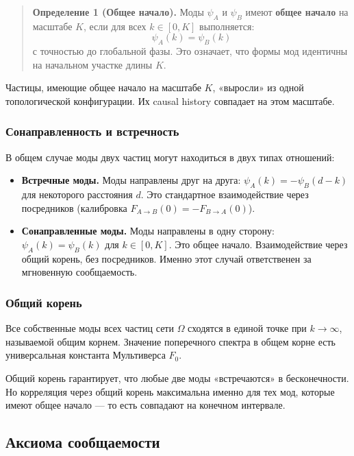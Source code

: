 \documentclass[12pt,a4paper]{article}
\begin{document}
\begin{quote}
\textbf{Определение 1 (Общее начало).} Моды $\psi_A$ и $\psi_B$ имеют \textbf{общее начало} на масштабе $K$, если для всех $k \in [0, K]$ выполняется:
\begin{equation}
    \psi_A(k) = \psi_B(k)
\end{equation}
с точностью до глобальной фазы. Это означает, что формы мод идентичны на начальном участке длины $K$.
\end{quote}

Частицы, имеющие общее начало на масштабе $K$, «выросли» из одной топологической конфигурации. Их causal history совпадает на этом масштабе.

\subsubsection{Сонаправленность и встречность}
В общем случае моды двух частиц могут находиться в двух типах отношений:
\begin{itemize}
    \item \textbf{Встречные моды.} Моды направлены друг на друга: $\psi_A(k) = -\psi_B(d - k)$ для некоторого расстояния $d$. Это стандартное взаимодействие через посредников (калибровка $F_{A \to B}(0) = -F_{B \to A}(0)$).
    \item \textbf{Сонаправленные моды.} Моды направлены в одну сторону: $\psi_A(k) = \psi_B(k)$ для $k \in [0, K]$. Это общее начало. Взаимодействие через общий корень, без посредников. Именно этот случай ответственен за мгновенную сообщаемость.
\end{itemize}

\subsubsection{Общий корень}
Все собственные моды всех частиц сети $\Omega$ сходятся в единой точке при $k \to \infty$, называемой общим корнем. Значение поперечного спектра в общем корне есть универсальная константа Мультиверса $F_0$.

Общий корень гарантирует, что любые две моды «встречаются» в бесконечности. Но корреляция через общий корень максимальна именно для тех мод, которые имеют общее начало --- то есть совпадают на конечном интервале.

\subsection{Аксиома сообщаемости}
\end{document}
